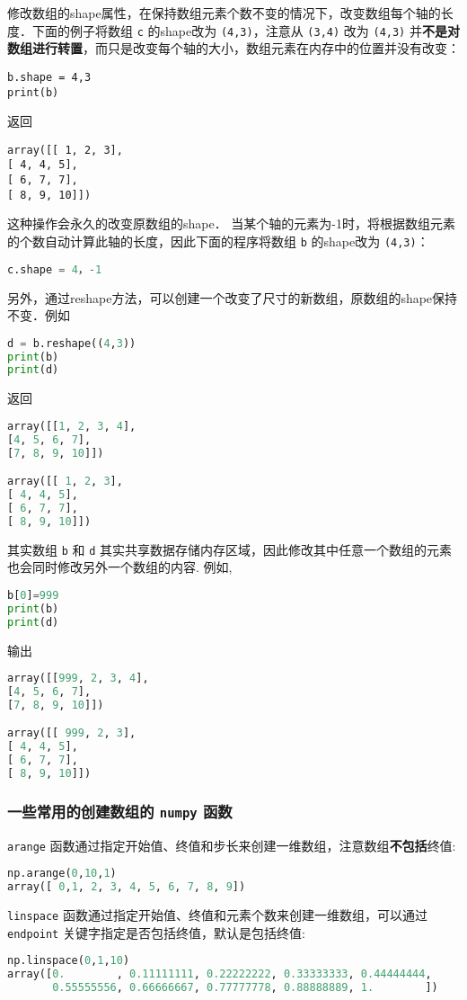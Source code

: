 修改数组的shape属性，在保持数组元素个数不变的情况下，改变数组每个轴的长度．下面的例子将数组 \verb|c| 的shape改为 \verb|(4,3)|，注意从 \verb|(3,4)| 改为 \verb|(4,3)| 并\textbf{不是对数组进行转置}，而只是改变每个轴的大小，数组元素在内存中的位置并没有改变：
\begin{lstlisting}
b.shape = 4,3
print(b)
\end{lstlisting}
返回
\begin{lstlisting}
array([[ 1, 2, 3],
[ 4, 4, 5],
[ 6, 7, 7],
[ 8, 9, 10]])
\end{lstlisting}
这种操作会永久的改变原数组的shape． 当某个轴的元素为-1时，将根据数组元素的个数自动计算此轴的长度，因此下面的程序将数组 \verb|b| 的shape改为 \verb|(4,3)|：
\begin{lstlisting}[language=python]
c.shape = 4，-1
\end{lstlisting}
另外，通过reshape方法，可以创建一个改变了尺寸的新数组，原数组的shape保持不变．例如
\begin{lstlisting}[language=python]
d = b.reshape((4,3))
print(b)
print(d)
\end{lstlisting}
返回
\begin{lstlisting}[language=python]
array([[1, 2, 3, 4],
[4, 5, 6, 7],
[7, 8, 9, 10]])

array([[ 1, 2, 3],
[ 4, 4, 5],
[ 6, 7, 7],
[ 8, 9, 10]])
\end{lstlisting}
其实数组 \verb|b| 和 \verb|d| 其实共享数据存储内存区域，因此修改其中任意一个数组的元素也会同时修改另外一个数组的内容. 例如,
\begin{lstlisting}[language=python]
b[0]=999
print(b)
print(d)
\end{lstlisting}
输出
\begin{lstlisting}[language=python]
array([[999, 2, 3, 4],
[4, 5, 6, 7],
[7, 8, 9, 10]])

array([[ 999, 2, 3],
[ 4, 4, 5],
[ 6, 7, 7],
[ 8, 9, 10]])
\end{lstlisting}


\subsubsection{一些常用的创建数组的 \verb|numpy| 函数}
\verb|arange| 函数通过指定开始值、终值和步长来创建一维数组，注意数组\textbf{不包括}终值:
\begin{lstlisting}[language=python]
np.arange(0,10,1)
array([ 0,1, 2, 3, 4, 5, 6, 7, 8, 9])
\end{lstlisting}

\verb|linspace| 函数通过指定开始值、终值和元素个数来创建一维数组，可以通过 \verb|endpoint| 关键字指定是否包括终值，默认是包括终值:
 \begin{lstlisting}[language=python]
np.linspace(0,1,10)
array([0.        , 0.11111111, 0.22222222, 0.33333333, 0.44444444,
       0.55555556, 0.66666667, 0.77777778, 0.88888889, 1.        ])
 \end{lstlisting}

